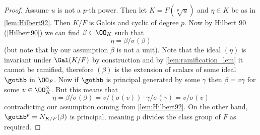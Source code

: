 \begin{proof}
	\leanok
	Assume $u$ is not a $p$-th power. Then let $K=F(\sqrt[p]{u})$  and $\eta \in K$ be as in \ref{lem:Hilbert92}. Then $K/F$ is Galois and cyclic of degree $p$. Now by Hilbert 90 (\ref{Hilbert90})  we can find $\beta \in \OO_K$ such that \[\eta = \beta/\sigma(\beta)\] (but note that by our assumption $\beta$ is not a unit). Note that the ideal $(\eta)$ is invariant under $\Gal(K/F)$ by construction and by \ref{lem:ramification_lem} it cannot be ramified, therefore $(\beta)$ is the extension of scalars of some ideal $\gothb$ in $\OO_F$. Now if $\gothb$ is principal generated by some $\gamma$ then $\beta=v \gamma$  for some $v \in \OO_K^\times$.
	But this means that \[\eta = \beta/\sigma(\beta)= v/(\sigma(v)) \cdot \gamma / \sigma(\gamma)=v/\sigma(v)  \] contradicting our assumption coming from \ref{lem:Hilbert92}. On the other hand, $\gothb^p= N_{K/F}(\beta)$ is principal, meaning $p$ divides the class group of $F$ as required.

\end{proof}


